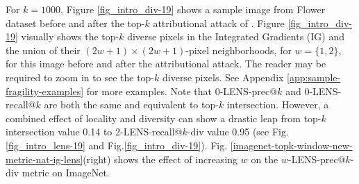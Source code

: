 \documentclass[letterpaper]{article} %
\begin{document}
For $k=1000$, Figure \ref{fig_intro_div-19} shows a sample image from Flower dataset before and after the top-$k$ attributional attack of \citet{ghorbani2018interpretation}. Figure \ref{fig_intro_div-19} visually shows the top-$k$ diverse pixels in the Integrated Gradients (IG) and the union of their $(2w+1) \times (2w+1)$-pixel neighborhoods, for $w=\{1, 2\}$, for this image before and after the attributional attack. The reader may be required to zoom in to see the top-$k$ diverse pixels. See Appendix \ref{app:sample-fragility-examples} for more examples. Note that $0$-LENS-prec@$k$ and $0$-LENS-recall@$k$ are both the same and equivalent to top-$k$ intersection. However, a combined effect of locality and diversity can show a drastic leap from top-$k$ intersection value 0.14 to $2$-LENS-recall@$k$-div value 0.95 (see Fig.\ref{fig_intro_lens-19} and Fig.\ref{fig_intro_div-19}). Fig. \ref{imagenet-topk-window-new-metric-nat-ig-lens}(right) shows the effect of increasing $w$ on the $w$-LENS-prec@$k$-div metric on ImageNet.

\end{document}
